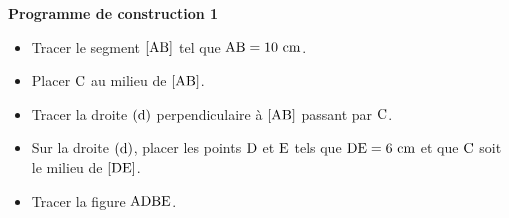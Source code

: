 \documentclass[exercice,a4]{thedocument}%
\begin{document}
%
\noindent\textbf{Programme de construction 1}\par\smallskip\noindent
\begin{itemize}
    \item Tracer le segment $[\text{AB}]$ tel que
    $\text{AB}=10\text{ cm}$.
    \item Placer $\text{C}$ au milieu de $[\text{AB}]$.
    \item Tracer la droite $(\text{d})$ perpendiculaire à
    $[\text{AB}]$ passant par $\text{C}$.
    \item Sur la droite $(\text{d})$, placer les points
    $\text{D}$ et $\text{E}$ tels que
    $\text{DE}=6\text{ cm}$ et que $\text{C}$ soit le
    milieu de $[\text{DE}]$.
    \item Tracer la figure $\text{ADBE}$.
\end{itemize}
\end{document}
